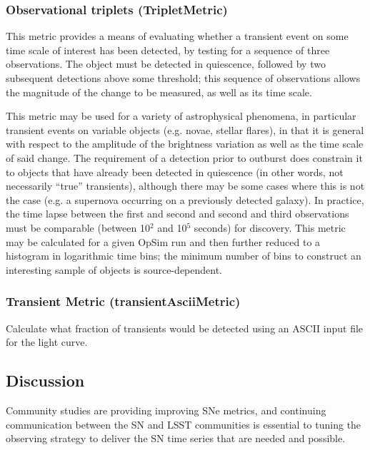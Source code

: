 \subsubsection{Observational triplets (TripletMetric)}

This metric provides a means of evaluating whether a transient event
on some time scale of interest has been detected, by testing for a
sequence of three observations. The object must be detected in
quiescence, followed by two subsequent detections above some
threshold; this sequence of observations allows the magnitude of the
change to be measured, as well as its time scale.

This metric may be used for a variety of astrophysical phenomena, in
particular transient events on variable objects (e.g. novae, stellar
flares), in that it is general with respect to the amplitude of the
brightness variation as well as the time scale of said change. The
requirement of a detection prior to outburst does constrain it to
objects that have already been detected in quiescence (in other words,
not necessarily ``true'' transients), although there may be some cases
where this is not the case (e.g. a supernova occurring on a previously
detected galaxy). In practice, the time lapse between the first and
second and second and third observations must be comparable (between
10$^2$ and 10$^5$ seconds) for discovery. This metric may be
calculated for a given OpSim run and then further reduced to a
histogram in logarithmic time bins; the minimum number of bins to
construct an interesting sample of objects is source-dependent.

\subsubsection{Transient Metric (transientAsciiMetric)}

Calculate what fraction of transients would be detected using an ASCII
input file for the light curve.



\subsection{Discussion}
\label{sec:\chpname:discussion}

Community studies are providing improving SNe metrics, and continuing
communication between the SN and LSST communities is essential to
tuning the observing strategy to deliver the SN time series that are
needed and possible.

